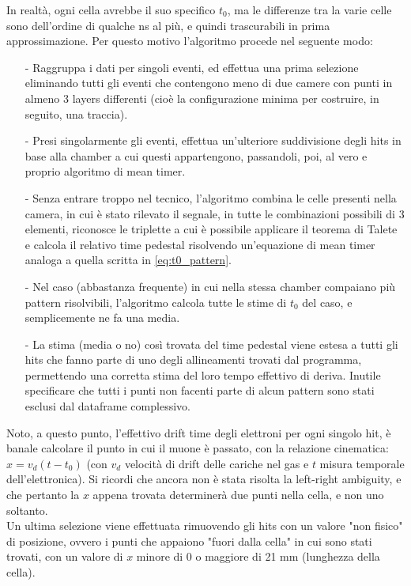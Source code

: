 \documentclass[a4paper,11pt]{book}
\begin{document}
In realtà, ogni cella avrebbe il suo specifico $t_0$, ma le differenze tra la varie celle sono dell'ordine di qualche ns al più, e quindi trascurabili in prima approssimazione. Per questo motivo l'algoritmo procede nel seguente modo:
\begin{itemize}
\item[-] Raggruppa i dati per singoli eventi, ed effettua una prima selezione eliminando tutti gli eventi che contengono meno di due camere con punti in almeno 3 layers differenti (cioè la configurazione minima per costruire, in seguito, una traccia).
\item[-] Presi singolarmente gli eventi, effettua un'ulteriore suddivisione degli hits in base alla chamber a cui questi appartengono, passandoli, poi, al vero e proprio algoritmo di mean timer.
\item[-] Senza entrare troppo nel tecnico, l'algoritmo combina le celle presenti nella camera, in cui è stato rilevato il segnale, in tutte le combinazioni possibili di 3 elementi, riconosce le triplette a cui è possibile applicare il teorema di Talete e calcola il relativo time pedestal risolvendo un'equazione di mean timer analoga a quella scritta in \ref{eq:t0_pattern}.
\item[-] Nel caso (abbastanza frequente) in cui nella stessa chamber compaiano più pattern risolvibili, l'algoritmo calcola tutte le stime di $t_0$ del caso, e semplicemente ne fa una media. 
\item[-] La stima (media o no) così trovata del time pedestal viene estesa a tutti gli hits che fanno parte di uno degli allineamenti trovati dal programma, permettendo una corretta stima del loro tempo effettivo di deriva. Inutile specificare che tutti i punti non facenti parte di alcun pattern sono stati esclusi dal dataframe complessivo.
\end{itemize}


Noto, a questo punto, l'effettivo drift time degli elettroni per ogni singolo hit, è banale calcolare il punto in cui il muone è passato, con la relazione cinematica: $x = v_d(t - t_0)$ (con $v_d$ velocità di drift delle cariche nel gas e $t$ misura temporale dell'elettronica). Si ricordi che ancora non è stata risolta la left-right ambiguity, e che pertanto la $x$ appena trovata determinerà due punti nella cella, e non uno soltanto.\\
Un ultima selezione viene effettuata rimuovendo gli hits con un valore "non fisico" di posizione, ovvero i punti che appaiono "fuori dalla cella" in cui sono stati trovati, con un valore di $x$ minore di 0 o maggiore di 21 mm (lunghezza della cella).\\
\end{document}
